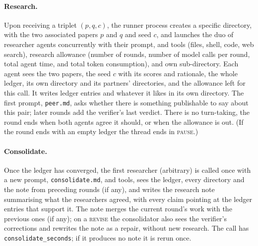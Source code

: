 \documentclass[11pt,a4paper]{article}
\newcommand{\st}[1]{\textsc{#1}}
\newcommand{\file}[1]{\texttt{#1}}
\begin{document}
\paragraph{Research.} Upon receiving a triplet $(p,q,c)$,
the runner process creates a specific directory, 
with the two associated papers $p$ and $q$ and seed $c$, 
and launches the duo of researcher agents concurrently with their prompt, and tools (files, shell, code, web search),
research allowance (number of rounds, number of model calls per round, total agent time, and total token consumption), and own sub-directory. Each agent sees the two papers, the
seed $c$ with its scores and rationale, the whole ledger, its own directory and its partners'
directories, and the allowance left for this call. It writes ledger entries %
and whatever it likes in its own directory. The first prompt, \file{peer.md}, asks whether there
is something publishable to say about this pair; later
rounds add the verifier's last verdict. There is no turn-taking,
the round ends when both agents agree it should,
or when the allowance is out. 
(If the round
ends with an empty ledger the thread ends in \st{pause}.)

\paragraph{Consolidate.} Once the ledger has converged, 
the first researcher (arbitrary) is called once with a new prompt, \file{consolidate.md}, and
tools, sees the ledger, every directory and the note from preceding rounds (if any), and writes 
the research note summarising what the researchers agreed, with every claim pointing at the ledger entries
that support it. The note merges the current
round's work with the previous ones (if any); on a \st{revise} the consolidator
also sees the verifier's corrections and rewrites the note as a repair, without new research. The call has \file{consolidate\_seconds}; if it produces no
note it is rerun once.
\end{document}
